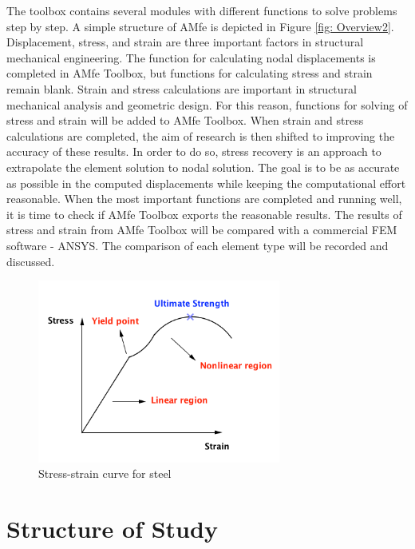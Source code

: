 The toolbox contains several modules with different functions to solve problems step by step. A simple structure of AMfe is depicted in Figure \ref{fig: Overview2}. Displacement, stress, and strain are three important factors in structural mechanical engineering. The function for calculating nodal displacements is completed in AMfe Toolbox, but functions for calculating stress and strain remain blank. Strain and stress calculations are important in structural mechanical analysis and geometric design. For this reason, functions for solving of stress and strain will be added to AMfe Toolbox. When strain and stress calculations are completed, the aim of research is then shifted to improving the accuracy of these results. In order to do so, stress recovery is an approach to extrapolate the element solution to nodal solution. The goal is to be as accurate as possible in the computed displacements while keeping the computational effort reasonable. When the most important functions are completed and running well, it is time to check if AMfe Toolbox exports the reasonable results. The results of stress and strain from AMfe Toolbox will be compared with a commercial FEM software - ANSYS. The comparison of each element type will be recorded and discussed. 

\begin{figure}
	\begin{center}
		\includegraphics[width=8cm,clip]{nonlinear.pdf}			
		\caption{Stress-strain curve for steel} \label{fig: nonlinear}
	\end{center}
\end{figure}

\section{Structure of Study}

